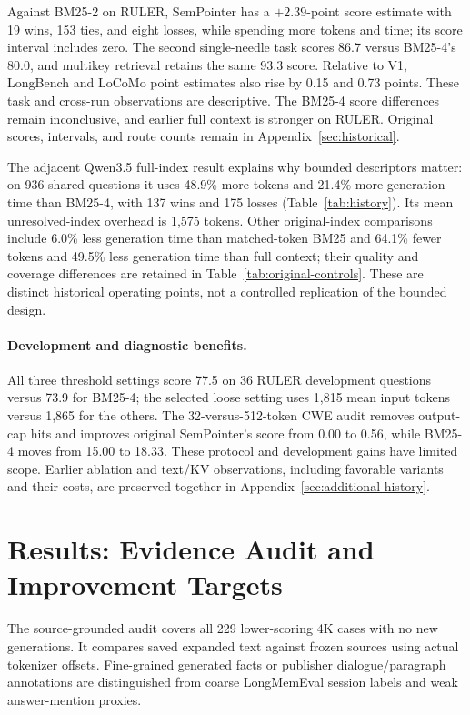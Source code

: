 \documentclass[runningheads]{llncs}
\begin{document}
Against BM25-2 on RULER, SemPointer has a $+2.39$-point score estimate with 19 wins, 153 ties, and eight losses, while spending more tokens and time; its score interval includes zero. The second single-needle task scores 86.7 versus BM25-4's 80.0, and multikey retrieval retains the same 93.3 score. Relative to V1, LongBench and LoCoMo point estimates also rise by 0.15 and 0.73 points. These task and cross-run observations are descriptive. The BM25-4 score differences remain inconclusive, and earlier full context is stronger on RULER. Original scores, intervals, and route counts remain in Appendix~\ref{sec:historical}.

The adjacent Qwen3.5 full-index result explains why bounded descriptors matter: on 936 shared questions it uses 48.9\% more tokens and 21.4\% more generation time than BM25-4, with 137 wins and 175 losses (Table~\ref{tab:history}). Its mean unresolved-index overhead is 1,575 tokens. Other original-index comparisons include 6.0\% less generation time than matched-token BM25 and 64.1\% fewer tokens and 49.5\% less generation time than full context; their quality and coverage differences are retained in Table~\ref{tab:original-controls}. These are distinct historical operating points, not a controlled replication of the bounded design.

\paragraph{Development and diagnostic benefits.}
All three threshold settings score 77.5 on 36 RULER development questions versus 73.9 for BM25-4; the selected loose setting uses 1,815 mean input tokens versus 1,865 for the others. The 32-versus-512-token CWE audit removes output-cap hits and improves original SemPointer's score from 0.00 to 0.56, while BM25-4 moves from 15.00 to 18.33. These protocol and development gains have limited scope. Earlier ablation and text/KV observations, including favorable variants and their costs, are preserved together in Appendix~\ref{sec:additional-history}.

\section{Results: Evidence Audit and Improvement Targets}
The source-grounded audit covers all 229 lower-scoring 4K cases with no new generations. It compares saved expanded text against frozen sources using actual tokenizer offsets. Fine-grained generated facts or publisher dialogue/paragraph annotations are distinguished from coarse LongMemEval session labels and weak answer-mention proxies.
\end{document}
